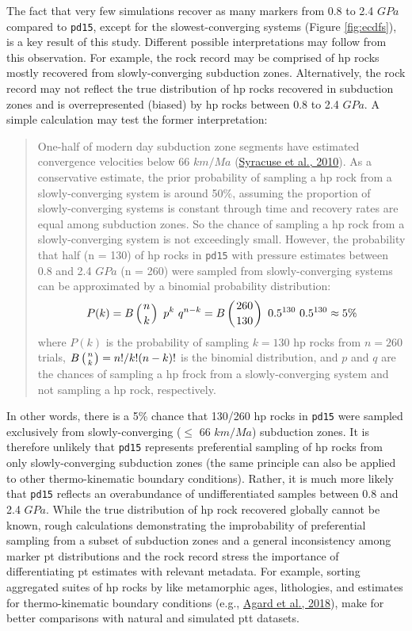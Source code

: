 The fact that very few simulations recover as many markers from 0.8 to 2.4 \(GPa\) compared to \texttt{pd15}, except for the slowest-converging systems (Figure \ref{fig:ecdfs}), is a key result of this study. Different possible interpretations may follow from this observation. For example, the rock record may be comprised of \gls{hp} rocks mostly recovered from slowly-converging subduction zones. Alternatively, the rock record may not reflect the true distribution of \gls{hp} rocks recovered in subduction zones and is overrepresented (biased) by \gls{hp} rocks between 0.8 to 2.4 \(GPa\). A simple calculation may test the former interpretation:

\begin{quote}
One-half of modern day subduction zone segments have estimated convergence velocities below 66 \(km/Ma\) (\protect\hyperlink{ref-syracuse2010}{Syracuse et al., 2010}). As a conservative estimate, the prior probability of sampling a \gls{hp} rock from a slowly-converging system is around 50\%, assuming the proportion of slowly-converging systems is constant through time and recovery rates are equal among subduction zones. So the chance of sampling a \gls{hp} rock from a slowly-converging system is not exceedingly small. However, the probability that half (n = 130) of \gls{hp} rocks in \texttt{pd15} with pressure estimates between 0.8 and 2.4 \(GPa\) (n = 260) were sampled from slowly-converging systems can be approximated by a binomial probability distribution:
\begin{equation}P(k) = B\left(n \atop k \right)\ p^k\ q^{n-k} = B\left(260 \atop 130 \right)\ 0.5^{130}\ 0.5^{130} \approx 5\% \label{eq:binom} \end{equation}
where \(P(k)\) is the probability of sampling \(k=130\) \gls{hp} rocks from \(n=260\) trials, \(B\left( n \atop k \right) = n!/k!(n-k)!\) is the binomial distribution, and \(p\) and \(q\) are the chances of sampling a \gls{hp} frock from a slowly-converging system and not sampling a \gls{hp} rock, respectively.
\end{quote}

In other words, there is a 5\% chance that 130/260 \gls{hp} rocks in \texttt{pd15} were sampled exclusively from slowly-converging (\(\leq\) 66 \(km/Ma\)) subduction zones. It is therefore unlikely that \texttt{pd15} represents preferential sampling of \gls{hp} rocks from only slowly-converging subduction zones (the same principle can also be applied to other thermo-kinematic boundary conditions). Rather, it is much more likely that \texttt{pd15} reflects an overabundance of undifferentiated samples between 0.8 and 2.4 \(GPa\). While the true distribution of \gls{hp} rock recovered globally cannot be known, rough calculations demonstrating the improbability of preferential sampling from a subset of subduction zones and a general inconsistency among marker \gls{pt} distributions and the rock record stress the importance of differentiating \gls{pt} estimates with relevant metadata. For example, sorting aggregated suites of \gls{hp} rocks by like metamorphic ages, lithologies, and estimates for thermo-kinematic boundary conditions (e.g., \protect\hyperlink{ref-agard2018}{Agard et al., 2018}), make for better comparisons with natural and simulated \gls{ptt} datasets.

